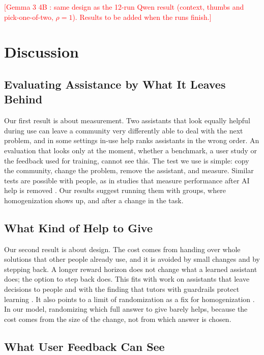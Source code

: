 \documentclass[11pt]{article}
\newcommand{\pending}[1]{\textcolor{red}{[#1]}}
\begin{document}
\pending{Gemma 3 4B \citep{gemma2025gemma3}: same design as the 12-run Qwen result (context, thumbs and pick-one-of-two, $\rho=1$). Results to be added when the runs finish.}

\section{Discussion}
\label{sec:discussion}

\subsection{Evaluating Assistance by What It Leaves Behind}

Our first result is about measurement. Two assistants that look equally helpful during use can leave a community very differently able to deal with the next problem, and in some settings in-use help ranks assistants in the wrong order. An evaluation that looks only at the moment, whether a benchmark, a user study or the feedback used for training, cannot see this. The test we use is simple: copy the community, change the problem, remove the assistant, and measure. Similar tests are possible with people, as in studies that measure performance after AI help is removed \citep{bastani2025generative,kumar2025human}. Our results suggest running them with groups, where homogenization shows up, and after a change in the task.

\subsection{What Kind of Help to Give}

Our second result is about design. The cost comes from handing over whole solutions that other people already use, and it is avoided by small changes and by stepping back. A longer reward horizon does not change what a learned assistant does; the option to step back does. This fits with work on assistants that leave decisions to people \citep{myers2024learning} and with the finding that tutors with guardrails protect learning \citep{bastani2025generative}. It also points to a limit of randomization as a fix for homogenization \citep{jain2024scarce}. In our model, randomizing which full answer to give barely helps, because the cost comes from the size of the change, not from which answer is chosen.

\subsection{What User Feedback Can See}
\end{document}
